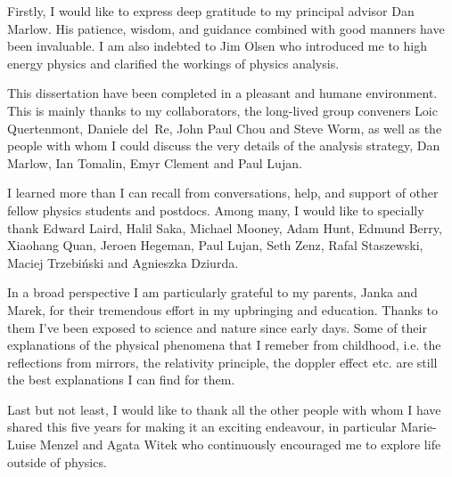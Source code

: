 
Firstly, I would like to express deep gratitude to my principal advisor Dan Marlow. His patience,
wisdom, and guidance combined with good manners have been invaluable. 
I am also indebted to Jim Olsen who introduced me to high energy physics and clarified the workings
of physics analysis.


This dissertation have been completed in a pleasant and humane environment. This is mainly
thanks to my collaborators, the
long-lived group conveners Loic Quertenmont, Daniele del~Re, John Paul Chou and Steve Worm,
as well as the people with whom I could discuss the very details of the analysis strategy,
Dan Marlow, Ian Tomalin, Emyr Clement and Paul Lujan.

I learned more than I can recall from conversations, help, and support of other fellow
physics students and postdocs. Among many, I would like to specially thank Edward Laird, Halil Saka,
Michael Mooney, Adam Hunt, Edmund Berry, Xiaohang Quan, Jeroen Hegeman, Paul Lujan, Seth Zenz,
Rafal Staszewski, Maciej Trzebi\'nski and Agnieszka Dziurda. 

In a broad perspective I am particularly grateful to my parents, Janka and Marek, for their tremendous effort in my upbringing and education.
 Thanks to them I've been exposed to science and nature since early
days. Some of their explanations of the physical phenomena that I remeber from childhood,
i.e. the reflections from mirrors, the relativity principle, the doppler effect etc.
are still the best explanations I can find for them.

Last but not least, I would like to thank all the other people with whom I have shared 
this five years for making it an exciting endeavour, in particular Marie-Luise Menzel and Agata
Witek who continuously encouraged me to explore
life outside of physics.
